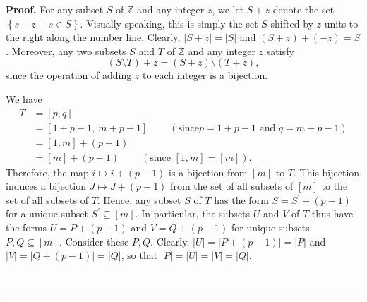 \documentclass[numbers=enddot,12pt,final,onecolumn,notitlepage]{scrartcl}%
\theoremstyle{definition}
\newenvironment{proof}[1][Proof]{\noindent\textbf{#1.} }{\ \rule{0.5em}{0.5em}}
\begin{document}
\begin{enumerate}
\begin{proof}
For any subset $S$ of $\mathbb{Z}$ and any integer $z$, we let $S+z$ denote
the set $\left\{  s+z\ \mid\ s\in S\right\}  $. Visually speaking, this is
simply the set $S$ shifted by $z$ units to the right along the number line.
Clearly, $\left\vert S+z\right\vert =\left\vert S\right\vert $ and $\left(
S+z\right)  +\left(  -z\right)  =S$. Moreover, any two subsets $S$ and $T$ of
$\mathbb{Z}$ and any integer $z$ satisfy%
\begin{equation}
\left(  S\setminus T\right)  +z=\left(  S+z\right)  \setminus\left(
T+z\right)  , \label{p17.lemA3.pf.diff}%
\end{equation}
since the operation of adding $z$ to each integer is a bijection.

We have%
\begin{align}
T &  =\left[  p,q\right]  \nonumber\\
&  =\left[  1+p-1,\ m+p-1\right]  \ \ \ \ \ \ \ \ \ \ \left(  \text{since
}p=1+p-1\text{ and }q=m+p-1\right)  \nonumber\\
&  =\left[  1,m\right]  +\left(  p-1\right)  \nonumber\\
&  =\left[  m\right]  +\left(  p-1\right)  \ \ \ \ \ \ \ \ \ \ \left(
\text{since }\left[  1,m\right]  =\left[  m\right]  \right)
.\label{p17.lemA3.pf.T}%
\end{align}
Therefore, the map $i\mapsto i+\left(  p-1\right)  $ is a bijection from
$\left[  m\right]  $ to $T$. This bijection induces a bijection $J\mapsto
J+\left(  p-1\right)  $ from the set of all subsets of $\left[  m\right]  $ to
the set of all subsets of $T$. Hence, any subset $S$ of $T$ has the form
$S=S^{\prime}+\left(  p-1\right)  $ for a unique subset $S^{\prime}%
\subseteq\left[  m\right]  $. In particular, the subsets $U$ and $V$ of $T$
thus have the forms $U=P+\left(  p-1\right)  $ and $V=Q+\left(  p-1\right)  $
for unique subsets $P,Q\subseteq\left[  m\right]  $. Consider these $P,Q$.
Clearly, $\left\vert U\right\vert =\left\vert P+\left(  p-1\right)
\right\vert =\left\vert P\right\vert $ and $\left\vert V\right\vert
=\left\vert Q+\left(  p-1\right)  \right\vert =\left\vert Q\right\vert $, so
that $\left\vert P\right\vert =\left\vert U\right\vert =\left\vert
V\right\vert =\left\vert Q\right\vert $.


\end{proof}
\end{enumerate}
\end{document}
